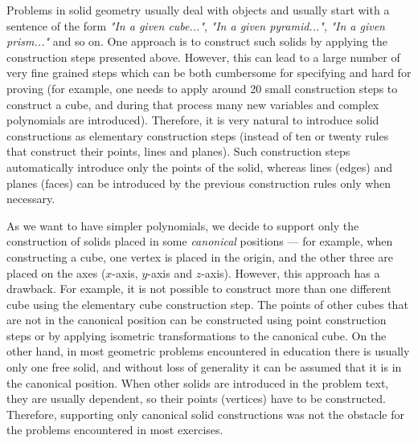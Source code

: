 \documentclass[final,1p,times,authoryear]{elsarticle}
\begin{document}
Problems in solid geometry usually deal with objects and usually start
with a sentence of the form {\em "In a given cube..."}, {\em "In a
  given pyramid..."}, {\em "In a given prism..."} and so on. One
approach is to construct such solids by applying the construction
steps presented above. However, this can lead to a large number of
very fine grained steps which can be both cumbersome for specifying
and hard for proving (for example, one needs to apply around 20 small
construction steps to construct a cube, and during that process many
new variables and complex polynomials are introduced). Therefore, it
is very natural to introduce solid constructions as elementary
construction steps (instead of ten or twenty rules that construct
their points, lines and planes). Such construction steps automatically
introduce only the points of the solid, whereas lines (edges) and
planes (faces) can be introduced by the previous construction rules
only when necessary.

As we want to have simpler polynomials, we decide to support only the
construction of solids placed in some {\em canonical} positions ---
for example, when constructing a cube, one vertex is placed in the
origin, and the other three are placed on the axes ($x$-axis, $y$-axis
and $z$-axis). However, this approach has a drawback. For example, it
is not possible to construct more than one different cube using the
elementary cube construction step. The points of other cubes that are
not in the canonical position can be constructed using point
construction steps or by applying isometric transformations to the
canonical cube. On the other hand, in most geometric problems
encountered in education there is usually only one free solid, and
without loss of generality it can be assumed that it is in the
canonical position. When other solids are introduced in the problem
text, they are usually dependent, so their points (vertices) have to
be constructed. Therefore, supporting only canonical solid
constructions was not the obstacle for the problems encountered in
most exercises.
\end{document}

